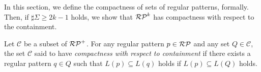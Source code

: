 
In this section, we define the compactness of sets of regular patterns, formally.
Then, if $\sharp\Sigma \ge 2k-1$ holds, 
we show that 
$\mathcal{RP}^{k}$ has compactness with respect to the containment.

\begin{dfn}\label{def:compactness}
Let $\mathcal{C}$ be a subset of $\mathcal{RP}^{+}$. 
For any regular pattern $p \in \mathcal{RP}$ and any set $Q \in \mathcal{C}$,
the set $\mathcal{C}$ said to have {\it compactness with respect to containment}
if there exists a regular pattern $q \in Q$ such that $L(p) \subseteq L(q)$ holds if $L(p) \subseteq L(Q)$ holds.
\end{dfn}


